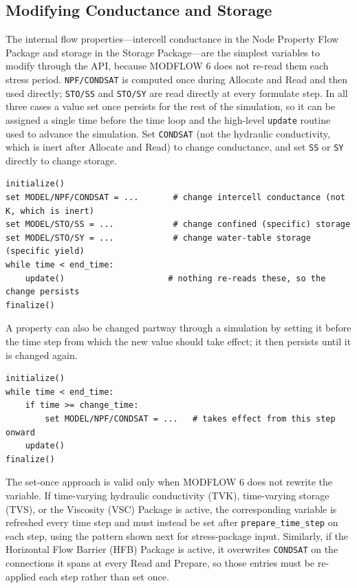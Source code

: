 \subsection{Modifying Conductance and Storage}

The internal flow properties---intercell conductance in the Node Property Flow
Package and storage in the Storage Package---are the simplest variables to modify
through the API, because MODFLOW 6 does not re-read them each stress period.
\texttt{NPF/CONDSAT} is computed once during Allocate and Read and then used
directly; \texttt{STO/SS} and \texttt{STO/SY} are read directly at every formulate
step. In all three cases a value set once persists for the rest of the
simulation, so it can be assigned a single time before the time loop and the
high-level \texttt{update} routine used to advance the simulation. Set
\texttt{CONDSAT} (not the hydraulic conductivity, which is inert after Allocate
and Read) to change conductance, and set \texttt{SS} or \texttt{SY} directly to
change storage.

\begin{lstlisting}[style=pseudocode]
initialize()
set MODEL/NPF/CONDSAT = ...       # change intercell conductance (not K, which is inert)
set MODEL/STO/SS = ...            # change confined (specific) storage
set MODEL/STO/SY = ...            # change water-table storage (specific yield)
while time < end_time:
    update()                     # nothing re-reads these, so the change persists
finalize()
\end{lstlisting}

\noindent A property can also be changed partway through a simulation by setting
it before the time step from which the new value should take effect; it then
persists until it is changed again.

\begin{lstlisting}[style=pseudocode]
initialize()
while time < end_time:
    if time >= change_time:
        set MODEL/NPF/CONDSAT = ...   # takes effect from this step onward
    update()
finalize()
\end{lstlisting}

\noindent The set-once approach is valid only when MODFLOW 6 does not rewrite the
variable. If time-varying hydraulic conductivity (TVK), time-varying storage
(TVS), or the Viscosity (VSC) Package is active, the corresponding variable is
refreshed every time step and must instead be set after \texttt{prepare\_time\_step}
on each step, using the pattern shown next for stress-package input. Similarly, if
the Horizontal Flow Barrier (HFB) Package is active, it overwrites \texttt{CONDSAT}
on the connections it spans at every Read and Prepare, so those entries must be
re-applied each step rather than set once.

